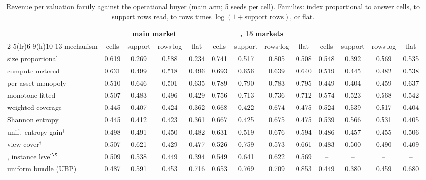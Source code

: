 
\begin{table}[tp]
  \centering
  \footnotesize
  \setlength{\tabcolsep}{3pt}
  \caption{Revenue per valuation family against the operational buyer (main arm; 5 seeds per cell). Families: index proportional to answer cells, to support rows read, to rows times $\log(1 + \text{support rows})$, or flat.}
  \label{tab:app-family-revenue}
  \begin{tabular}{@{}lcccccccccccc@{}}
    \toprule
    & \multicolumn{4}{c}{\sqlshare{} main market} & \multicolumn{4}{c}{\sqlshare{}, 15 markets} & \multicolumn{4}{c}{\tpch{}} \\
    \cmidrule(lr){2-5}\cmidrule(lr){6-9}\cmidrule(lr){10-13}
    mechanism & cells & support & rows$\cdot$log & flat & cells & support & rows$\cdot$log & flat & cells & support & rows$\cdot$log & flat \\
    \midrule
    size proportional & 0.619 & 0.269 & 0.588 & 0.234 & 0.741 & 0.517 & 0.805 & 0.508 & 0.548 & 0.392 & 0.569 & 0.535 \\
    compute metered & 0.631 & 0.499 & 0.518 & 0.496 & 0.693 & 0.656 & 0.639 & 0.640 & 0.519 & 0.445 & 0.482 & 0.538 \\
    per-asset monopoly & 0.510 & 0.646 & 0.501 & 0.635 & 0.789 & 0.790 & 0.783 & 0.795 & 0.449 & 0.404 & 0.459 & 0.637 \\
    monotone fitted & 0.507 & 0.483 & 0.496 & 0.429 & 0.756 & 0.713 & 0.736 & 0.712 & 0.574 & 0.523 & 0.568 & 0.542 \\
    \midrule
    \qirana{} weighted coverage & 0.445 & 0.407 & 0.424 & 0.362 & 0.668 & 0.422 & 0.674 & 0.475 & 0.524 & 0.539 & 0.517 & 0.404 \\
    \qirana{} Shannon entropy & 0.445 & 0.412 & 0.423 & 0.361 & 0.667 & 0.425 & 0.675 & 0.475 & 0.539 & 0.566 & 0.531 & 0.405 \\
    \qirana{} unif.\ entropy gain$^{\ddagger}$ & 0.498 & 0.491 & 0.450 & 0.482 & 0.631 & 0.519 & 0.676 & 0.594 & 0.486 & 0.457 & 0.455 & 0.506 \\
    \querymarket{} view cover$^{\dagger}$ & 0.507 & 0.621 & 0.429 & 0.477 & 0.526 & 0.759 & 0.573 & 0.661 & 0.483 & 0.500 & 0.490 & 0.409 \\
    \querymarket{}, instance level$^{\S}$ & 0.509 & 0.538 & 0.449 & 0.394 & 0.549 & 0.641 & 0.622 & 0.569 & -- & -- & -- & -- \\
    \midrule
    uniform bundle (UBP) & 0.487 & 0.591 & 0.453 & 0.716 & 0.653 & 0.769 & 0.709 & 0.853 & 0.449 & 0.380 & 0.459 & 0.680 \\

\end{tabular}
\end{table}
